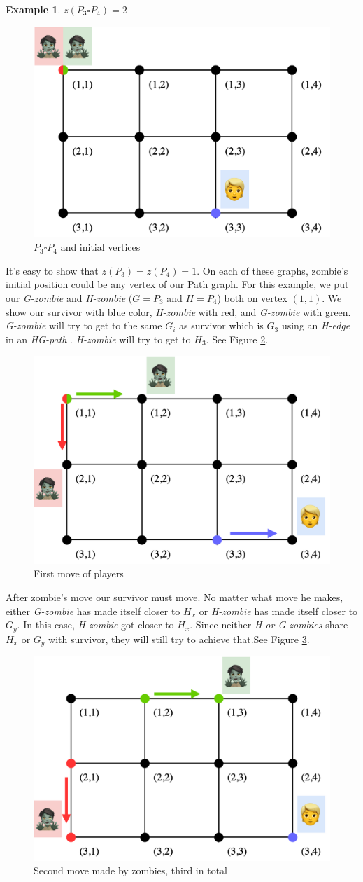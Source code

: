 \documentclass[1p]{elsarticle}
\newtheorem{example}[theorem]{Example}
\begin{document}
\begin{example} $z(P_3 \square P_4 ) = 2$
	
\end{example}
\begin{figure}[h!]
	\centering
	\includegraphics[width=0.5\linewidth]{fig/p34m1.png}
	\caption{$P_3 \square P_4$ and initial vertices}
	\label{fig:p3}
\end{figure}
It's easy to show that $z(P_3) = z(P_4) = 1$. On each of these graphs, zombie's initial position could be any vertex of
our Path graph. For this example, we put our {\it G-zombie} and {\it H-zombie} ($G = P_3$ and $H = P_4$) both on vertex
$(1,1)$. We show our survivor with blue color, {\it H-zombie} with red, and {\it G-zombie} with green. {\it G-zombie}
will try to get to the same $G_{i}$ as survivor which is $G_3$ using an {\it H-edge} in an {\it HG-path} . {\it
H-zombie} will try to get to $H_3$. See Figure \ref{fig:p4}.
\begin{figure}[h!]
	\centering
	\includegraphics[width=0.5\linewidth]{fig/p34m2.png}
	\caption{First move of players}
	\label{fig:p4}
\end{figure}
After zombie's move our survivor must move. No matter what move he makes, either {\it G-zombie} has made itself closer
to $H_x$ or {\it H-zombie} has made itself closer to $G_y$. In this case, {\it H-zombie} got closer to  $H_x$. Since
neither {\it H or G-zombies}  share $H_x$ or $G_y$ with survivor, they will still try to achieve that.See Figure
\ref{fig:p5}.
\begin{figure}[h!]
	\centering
	\includegraphics[width=0.5\linewidth]{fig/p34m3.png}
	\caption{Second move made by zombies, third in total}
	\label{fig:p5}
\end{figure}
\end{document}
